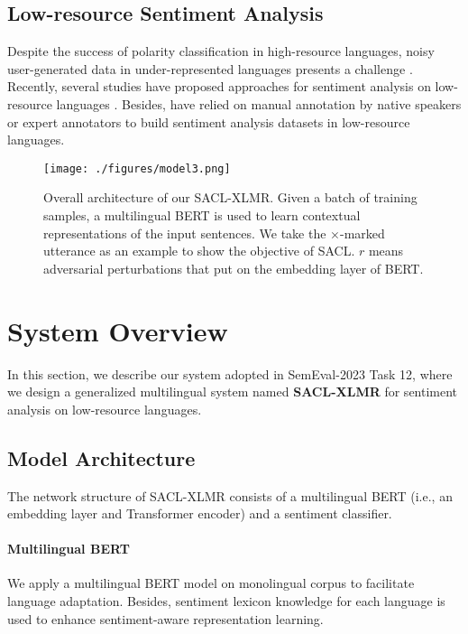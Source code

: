 \documentclass[11pt]{article}
\begin{document}
\subsection{Low-resource Sentiment Analysis}
Despite the success of polarity classification in high-resource languages, noisy user-generated data in under-represented languages presents a challenge \citep{DBLP:conf/coling/YimamAAB20}. 
Recently, several studies have proposed approaches for sentiment analysis on low-resource languages \citep{DBLP:journals/air/LoCCC17,DBLP:conf/coling/YimamAAB20}.
Besides, \citet{moudjari-etal-2020-algerian,adebara-abdul-mageed-2022-towards,muhammad2023afrisenti} have relied on manual annotation by native speakers or expert annotators to build sentiment analysis datasets in low-resource languages.

\begin{figure*}[t]
    \centering
    \texttt{[image: ./figures/model3.png]} 
    \caption{Overall architecture of our SACL-XLMR.
    Given a batch of training samples, a multilingual BERT is used to learn contextual representations of the input sentences. We take the $\boldsymbol{\times}$-marked utterance as an example to show the objective of SACL.
    $r$ means adversarial perturbations that put on the embedding layer of BERT.
    }
    \label{fig:model}
\end{figure*}


\section{System Overview}

In this section, we describe our system adopted in SemEval-2023 Task 12, where we design a generalized multilingual system named \textbf{SACL-XLMR} for sentiment analysis on low-resource languages.


\subsection{Model Architecture}
The network structure of SACL-XLMR consists of a multilingual BERT (i.e., an embedding layer and  Transformer encoder) and a sentiment classifier.

\paragraph{Multilingual BERT} \label{sec:xlmr}
We apply a multilingual BERT model \citep{DBLP:conf/nips/ConneauL19,DBLP:conf/coling/AlabiAMK22}
on monolingual corpus to facilitate language adaptation. Besides, sentiment lexicon knowledge for each language is used to enhance sentiment-aware representation learning.
\end{document}
